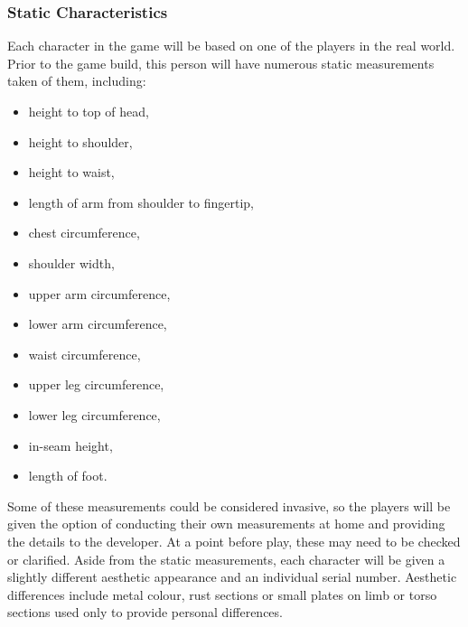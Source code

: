 \documentclass[journal]{IEEEtran}
\begin{document}
\subsubsection{Static Characteristics}
Each character in the game will be based on one of the players in the real world. Prior to the game build, this person will have numerous static measurements taken of them, including:
\begin{itemize}
	\item height to top of head,
	\item height to shoulder,
	\item height to waist,
	\item length of arm from shoulder to fingertip,
	\item chest circumference,
	\item shoulder width,
	\item upper arm circumference,
	\item lower arm circumference,
	\item waist circumference,
	\item upper leg circumference,
	\item lower leg circumference,
	\item in-seam height,
	\item length of foot.	
\end{itemize}
Some of these measurements could be considered invasive, so the players will be given the option of conducting their own measurements at home and providing the details to the developer. At a point before play, these may need to be checked or clarified.
\linebreak\linebreak
Aside from the static measurements, each character will be given a slightly different aesthetic appearance and an individual serial number. Aesthetic differences include metal colour, rust sections or small plates on limb or torso sections used only to provide personal differences.
\end{document}
